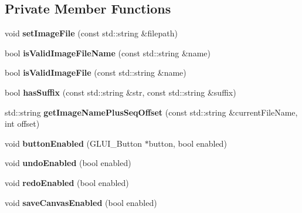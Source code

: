 \subsection*{Private Member Functions}
\begin{DoxyCompactItemize}
\item 
void {\bfseries set\+Image\+File} (const std\+::string \&filepath)\hypertarget{classMIAApp_abedcd0557f3b0204325cd4bcca276340}{}\label{classMIAApp_abedcd0557f3b0204325cd4bcca276340}

\item 
bool {\bfseries is\+Valid\+Image\+File\+Name} (const std\+::string \&name)\hypertarget{classMIAApp_ad5b10911bb27d75369ad862e3b2ddebf}{}\label{classMIAApp_ad5b10911bb27d75369ad862e3b2ddebf}

\item 
bool {\bfseries is\+Valid\+Image\+File} (const std\+::string \&name)\hypertarget{classMIAApp_a398a146bbe6183734c7ed3315564ac24}{}\label{classMIAApp_a398a146bbe6183734c7ed3315564ac24}

\item 
bool {\bfseries has\+Suffix} (const std\+::string \&str, const std\+::string \&suffix)\hypertarget{classMIAApp_a83b411e84479e41c2bc76e6d8ff35378}{}\label{classMIAApp_a83b411e84479e41c2bc76e6d8ff35378}

\item 
std\+::string {\bfseries get\+Image\+Name\+Plus\+Seq\+Offset} (const std\+::string \&current\+File\+Name, int offset)\hypertarget{classMIAApp_a9078ec25d516d07f95a2f0c0754e4910}{}\label{classMIAApp_a9078ec25d516d07f95a2f0c0754e4910}

\item 
void {\bfseries button\+Enabled} (G\+L\+U\+I\+\_\+\+Button $\ast$button, bool enabled)\hypertarget{classMIAApp_abdc30baa79b2e615855e9d6f53161991}{}\label{classMIAApp_abdc30baa79b2e615855e9d6f53161991}

\item 
void {\bfseries undo\+Enabled} (bool enabled)\hypertarget{classMIAApp_a7c78fda6a6f85758742bc29529daea91}{}\label{classMIAApp_a7c78fda6a6f85758742bc29529daea91}

\item 
void {\bfseries redo\+Enabled} (bool enabled)\hypertarget{classMIAApp_a1053652334f77c2abab878a61f833d02}{}\label{classMIAApp_a1053652334f77c2abab878a61f833d02}

\item 
void {\bfseries save\+Canvas\+Enabled} (bool enabled)\hypertarget{classMIAApp_ac7399aaf822439f5878b65eb3733504a}{}\label{classMIAApp_ac7399aaf822439f5878b65eb3733504a}


\end{DoxyCompactItemize}

